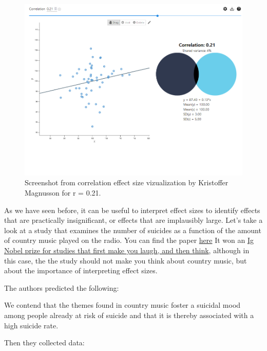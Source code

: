 \documentclass[
  oneside]{krantz}
\renewenvironment{quote}{\begin{VF}}{\end{VF}}
\begin{document}
\begin{figure}

{\centering \includegraphics[width=1\linewidth]{images/sharedvariance} 

}

\caption{Screenshot from correlation effect size vizualization by Kristoffer Magnusson for r = 0.21.}\label{fig:sharedvariance}
\end{figure}

As we have seen before, it can be useful to interpret effect sizes to identify effects that are practically insignificant, or effects that are implausibly large. Let's take a look at a study that examines the number of suicides as a function of the amount of country music played on the radio. You can find the paper \href{https://heinonline.org/HOL/P?h=hein.journals/josf71\&i=227}{here} It won an \href{http://www.abc.net.au/science/articles/2004/10/01/1211441.htm}{Ig Nobel prize for studies that first make you laugh, and then think}, although in this case, the the study should not make you think about country music, but about the importance of interpreting effect sizes.

The authors predicted the following:

\begin{quote}
We contend that the themes found in country music foster a suicidal mood among people already at risk of suicide and that it is thereby associated with a high suicide rate.
\end{quote}

Then they collected data:
\end{document}
